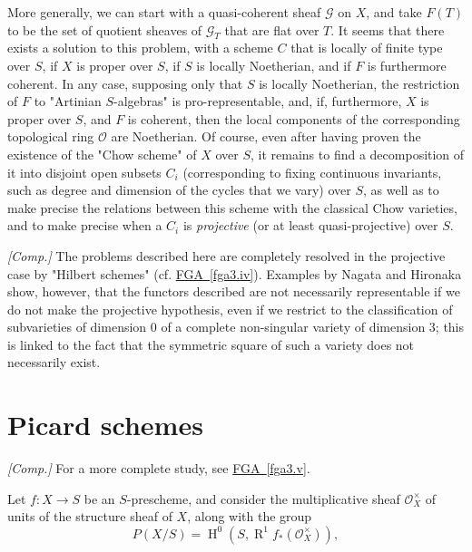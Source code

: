 \begin{remarks}{}
    More generally, we can start with a quasi-coherent sheaf \(\mathscr {G}\) on \(X\), and take \(F(T)\) to be the set of quotient sheaves of \(\mathscr {G}_T\) that are flat over \(T\).
    It seems that there exists a solution to this problem, with a scheme \(C\) that is locally of finite type over \(S\), if \(X\) is proper over \(S\), if \(S\) is locally Noetherian, and if \(F\) is furthermore coherent.
    In any case, supposing only that \(S\) is locally Noetherian, the restriction of \(F\) to "Artinian \(S\)-algebras" is pro-representable, and, if, furthermore, \(X\) is proper over \(S\), and \(F\) is coherent, then the local components of the corresponding topological ring \(\mathscr {O}\) are Noetherian.
    Of course, even after having proven the existence of the "Chow scheme" of \(X\) over \(S\), it remains to find a decomposition of it into disjoint open subsets \(C_i\) (corresponding to fixing continuous invariants, such as degree and dimension of the cycles that we vary) over \(S\), as well as to make precise the relations between this scheme with the classical Chow varieties, and to make precise when a \(C_i\) is \emph{projective} (or at least quasi-projective) over \(S\).\end{remarks}\begin{remark}{}\label{fga3.ii-c.2-remark}\skipsinglepar\par{}\emph{[Comp.]}
    The problems described here are completely resolved in the projective case by "Hilbert schemes" (cf. \hyperref[fga3.iv]{FGA~\ref*{fga3.iv}}).
    Examples by Nagata and Hironaka show, however, that the functors described are not necessarily representable if we do not make the projective hypothesis, even if we restrict to the classification of subvarieties of dimension \(0\) of a complete non-singular variety of dimension \(3\);
    this is linked to the fact that the symmetric square of such a variety does not necessarily exist.\end{remark}\section{Picard schemes}\label{fga3.ii-c.3}\par{}\emph{[Comp.]}
  For a more complete study, see \hyperref[fga3.v]{FGA~\ref*{fga3.v}}.\par{}Let \(f\colon  X\to  S\) be an \(S\)-prescheme, and consider the multiplicative sheaf \(\mathscr {O}_X^\times \) of units of the structure sheaf of \(X\), along with the group
  \[     P(X/S)     = \operatorname {H}^0(S,\operatorname {R}^1f_*(\mathscr {O}_X^\times )),   \]
